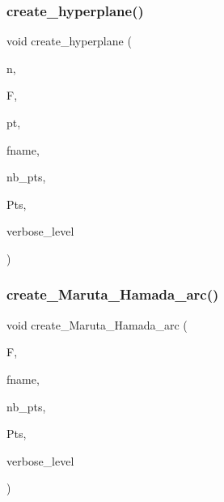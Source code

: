\subsubsection{\texorpdfstring{create\+\_\+hyperplane()}{create\_hyperplane()}}
{\footnotesize\ttfamily void create\+\_\+hyperplane (\begin{DoxyParamCaption}\item[{\mbox{\hyperlink{galois_8h_a09fddde158a3a20bd2dcadb609de11dc}{I\+NT}}}]{n,  }\item[{\mbox{\hyperlink{classfinite__field}{finite\+\_\+field}} $\ast$}]{F,  }\item[{\mbox{\hyperlink{galois_8h_a09fddde158a3a20bd2dcadb609de11dc}{I\+NT}}}]{pt,  }\item[{\mbox{\hyperlink{galois_8h_ab6cc7b4aeb6ea31aba2b3fbfc83ff5e6}{B\+Y\+TE}} $\ast$}]{fname,  }\item[{\mbox{\hyperlink{galois_8h_a09fddde158a3a20bd2dcadb609de11dc}{I\+NT}} \&}]{nb\+\_\+pts,  }\item[{\mbox{\hyperlink{galois_8h_a09fddde158a3a20bd2dcadb609de11dc}{I\+NT}} $\ast$\&}]{Pts,  }\item[{\mbox{\hyperlink{galois_8h_a09fddde158a3a20bd2dcadb609de11dc}{I\+NT}}}]{verbose\+\_\+level }\end{DoxyParamCaption})}

\mbox{\label{geometric__object_8_c_a788e7323142bf5f6ded51abe84dba9bf}} 
\subsubsection{\texorpdfstring{create\+\_\+\+Maruta\+\_\+\+Hamada\+\_\+arc()}{create\_Maruta\_Hamada\_arc()}}
{\footnotesize\ttfamily void create\+\_\+\+Maruta\+\_\+\+Hamada\+\_\+arc (\begin{DoxyParamCaption}\item[{\mbox{\hyperlink{classfinite__field}{finite\+\_\+field}} $\ast$}]{F,  }\item[{\mbox{\hyperlink{galois_8h_ab6cc7b4aeb6ea31aba2b3fbfc83ff5e6}{B\+Y\+TE}} $\ast$}]{fname,  }\item[{\mbox{\hyperlink{galois_8h_a09fddde158a3a20bd2dcadb609de11dc}{I\+NT}} \&}]{nb\+\_\+pts,  }\item[{\mbox{\hyperlink{galois_8h_a09fddde158a3a20bd2dcadb609de11dc}{I\+NT}} $\ast$\&}]{Pts,  }\item[{\mbox{\hyperlink{galois_8h_a09fddde158a3a20bd2dcadb609de11dc}{I\+NT}}}]{verbose\+\_\+level }\end{DoxyParamCaption})}

